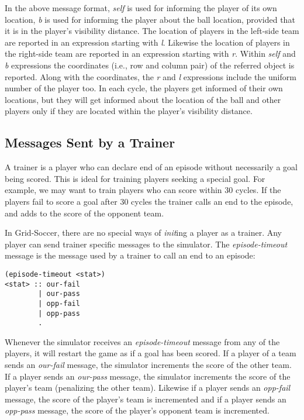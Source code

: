 \documentclass[12pt,titlepage,a4paper]{article}
\begin{document}
In the above message format, \emph{self} is used for informing the player of its own location, \emph{b} is used for informing the player about the ball location, provided that it is in the player's visibility distance. The location of players in the left-side team are reported in an expression starting with \emph{l}. Likewise the location of players in the right-side team are reported in an expression starting with \emph{r}. Within \emph{self} and \emph{b} expressions the coordinates (i.e., row and column pair) of the referred object is reported. Along with the coordinates, the \emph{r} and \emph{l} expressions include the uniform number of the player too. In each cycle, the players get informed of their own locations, but they will get informed about the location of the ball and other players only if they are located within the player's visibility distance.

\subsection{Messages Sent by a Trainer}

A trainer is a player who can declare end of an episode without necessarily a goal being scored. This is ideal for training players seeking a special goal. For example, we may want to train players who can score within 30 cycles. If the players fail to score a goal after 30 cycles the trainer calls an end to the episode, and adds to the score of the opponent team.

In Grid-Soccer, there are no special ways of \emph{init}ing a player as a trainer. Any player can send trainer specific messages to the simulator. The \emph{episode-timeout} message is the message used by a trainer to call an end to an episode:

\begin{verbatim}
(episode-timeout <stat>)
<stat> :: our-fail
        | our-pass
        | opp-fail
        | opp-pass
        .
\end{verbatim}

Whenever the simulator receives an \emph{episode-timeout} message from any of the players, it will restart the game as if a goal has been scored. If a player of a team sends an \emph{our-fail} message, the simulator increments the score of the other team. If a player sends an \emph{our-pass} message, the simulator increments the score of the player's team (penalizing the other team). Likewise if a player sends an \emph{opp-fail} message, the score of the player's team is incremented and if a player sends an \emph{opp-pass} message, the score of the player's opponent team is incremented.
\end{document}
